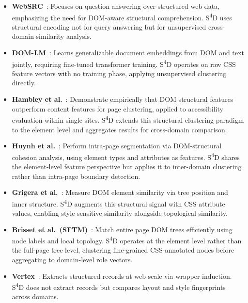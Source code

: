 \begin{itemize}
    \item \textbf{WebSRC}~\cite{chen2021websrc}: Focuses on question answering over structured web data, emphasizing the need for DOM-aware structural comprehension. S\textsuperscript{4}D uses structural encoding not for query answering but for unsupervised cross-domain similarity analysis.

    \item \textbf{DOM-LM}~\cite{deng2022domlm}: Learns generalizable document embeddings from DOM and text jointly, requiring fine-tuned transformer training. S\textsuperscript{4}D operates on raw CSS feature vectors with no training phase, applying unsupervised clustering directly.

    \item \textbf{Hambley et al.}~\cite{hambley2023webstructure}: Demonstrate empirically that DOM structural features outperform content features for page clustering, applied to accessibility evaluation within single sites. S\textsuperscript{4}D extends this structural clustering paradigm to the element level and aggregates results for cross-domain comparison.

    \item \textbf{Huynh et al.}~\cite{huynh2023segmentation}: Perform intra-page segmentation via DOM-structural cohesion analysis, using element types and attributes as features. S\textsuperscript{4}D shares the element-level feature perspective but applies it to inter-domain clustering rather than intra-page boundary detection.

    \item \textbf{Grigera et al.}~\cite{grigera2022domflexible}: Measure DOM element similarity via tree position and inner structure. S\textsuperscript{4}D augments this structural signal with CSS attribute values, enabling style-sensitive similarity alongside topological similarity.

    \item \textbf{Brisset et al.\ (SFTM)}~\cite{brisset2022sftm}: Match entire page DOM trees efficiently using node labels and local topology. S\textsuperscript{4}D operates at the element level rather than the full-page tree level, clustering fine-grained CSS-annotated nodes before aggregating to domain-level role vectors.

    \item \textbf{Vertex}~\cite{gulhane2011vertex}: Extracts structured records at web scale via wrapper induction. S\textsuperscript{4}D does not extract records but compares layout and style fingerprints across domains.


\end{itemize}
